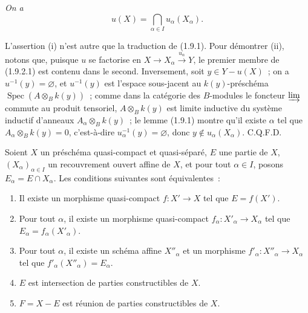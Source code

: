 
\begin{env}[1.9.2.ii]
\label{IV.1.9.2.ii-fr}
\emph{On a}
\[
  u(X)=\bigcap_{\alpha\in I}u_\alpha(X_\alpha). \tag{1.9.2.1}
  \label{IV.1.9.2.1-fr}
\]
\end{env}

L'assertion (i) n'est autre que la traduction de (1.9.1). Pour démontrer
(ii), notons que, puisque $u$ se factorise en
$X\to X_\alpha\xrightarrow{u_\alpha}Y$, le premier membre de (1.9.2.1) est
contenu dans le second. Inversement, soit $y\in Y-u(X)$~; on a
$u^{-1}(y)=\varnothing$, et $u^{-1}(y)$ est l'espace sous-jacent au
$k(y)$-préschéma $\operatorname{Spec}(A\otimes_Bk(y))$~; comme dans la
catégorie des $B$-modules le foncteur $\varinjlim$ commute au produit
tensoriel, $A\otimes_Bk(y)$ est limite inductive du système inductif d'anneaux
$A_\alpha\otimes_Bk(y)$~; le lemme (1.9.1) montre qu'il existe $\alpha$ tel
que $A_\alpha\otimes_Bk(y)=0$, c'est-à-dire
$u_\alpha^{-1}(y)=\varnothing$, donc $y\notin u_\alpha(X_\alpha)$. C.Q.F.D.

\begin{proposition}[1.9.3]
\label{IV.1.9.3-fr}
Soient $X$ un préschéma quasi-compact et quasi-séparé, $E$ une partie de $X$,
$(X_\alpha)_{\alpha\in I}$ un recouvrement ouvert affine de $X$, et pour
tout $\alpha\in I$, posons $E_\alpha=E\cap X_\alpha$. Les conditions
suivantes sont équivalentes~:
\begin{enumerate}
  \item[a)] Il existe un morphisme quasi-compact $f:X'\to X$ tel que
  $E=f(X')$.
  \item[a$'$)] Pour tout $\alpha$, il existe un morphisme quasi-compact
  $f_\alpha:X'_\alpha\to X_\alpha$ tel que
  $E_\alpha=f_\alpha(X'_\alpha)$.
  \item[a$''$)] Pour tout $\alpha$, il existe un schéma affine $X''_\alpha$
  et un morphisme $f'_\alpha:X''_\alpha\to X_\alpha$ tel que
  $f'_\alpha(X''_\alpha)=E_\alpha$.
  \item[b)] $E$ est intersection de parties constructibles de $X$.
  \item[b$'$)] $F=X-E$ est réunion de parties constructibles de $X$.
\end{enumerate}
\end{proposition}

